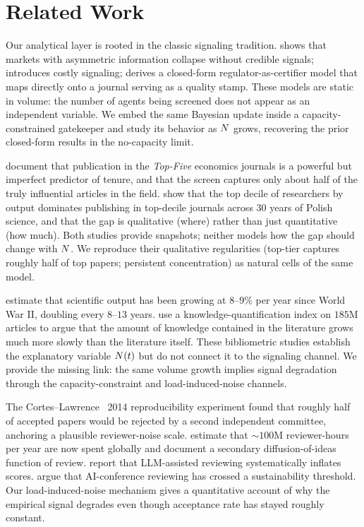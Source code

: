 \section{Related Work}
\label{sec:related}

 Our analytical layer is rooted in the classic signaling tradition. \citet{akerlof1970lemons} shows that markets with asymmetric information collapse without credible signals; \citet{spence1973job} introduces costly signaling; \citet{long2023lemons} derives a closed-form regulator-as-certifier model that maps directly onto a journal serving as a quality stamp. These models are static in volume: the number of agents being screened does not appear as an independent variable. We embed the same Bayesian update inside a capacity-constrained gatekeeper and study its behavior as $N$ grows, recovering the prior closed-form results in the no-capacity limit.

 \citet{heckman2019tyranny} document that publication in the \emph{Top-Five} economics journals is a powerful but imperfect predictor of tenure, and that the screen captures only about half of the truly influential articles in the field. \citet{kwiek2026topperformers} show that the top decile of researchers by output dominates publishing in top-decile journals across $30$ years of Polish science, and that the gap is qualitative (where) rather than just quantitative (how much). Both studies provide snapshots; neither models how the gap should change with $N$. We reproduce their qualitative regularities (top-tier captures roughly half of top papers; persistent concentration) as natural cells of the same model.

 \citet{bornmann2015growth} estimate that scientific output has been growing at $8$--$9\%$ per year since World War II, doubling every $8$--$13$ years. \citet{fu2021disproportion} use a knowledge-quantification index on $185$M articles to argue that the amount of knowledge contained in the literature grows much more slowly than the literature itself. These bibliometric studies establish the explanatory variable $N(t)$ but do not connect it to the signaling channel. We provide the missing link: the same volume growth implies signal degradation through the capacity-constraint and load-induced-noise channels.

 The Cortes--Lawrence \neurips~2014 reproducibility experiment found that roughly half of accepted papers would be rejected by a second independent committee, anchoring a plausible reviewer-noise scale. \citet{wang2025peerreview} estimate that $\sim 100$M reviewer-hours per year are now spent globally and document a secondary diffusion-of-ideas function of review. \citet{latona2024lottery} report that LLM-assisted reviewing systematically inflates scores. \citet{mohanty2025crisis} argue that AI-conference reviewing has crossed a sustainability threshold. Our load-induced-noise mechanism gives a quantitative account of why the empirical \iclr signal degrades even though acceptance rate has stayed roughly constant.

